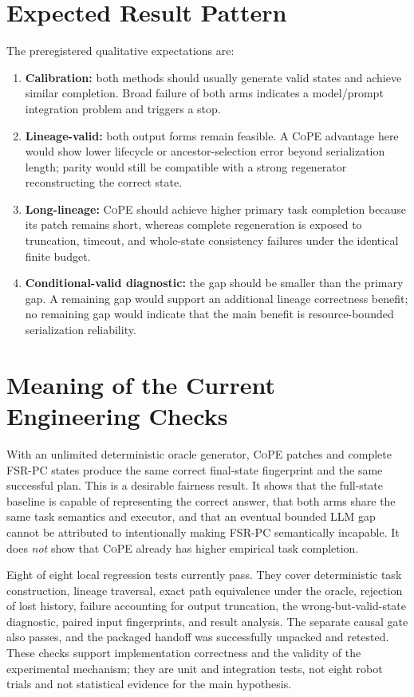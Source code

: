 \documentclass[10pt]{article}
\newcommand{\CoPE}{\textsc{CoPE}}
\newcommand{\FSRPC}{\textsc{FSR-PC}}
\begin{document}
\section{Expected Result Pattern}

The preregistered qualitative expectations are:
\begin{enumerate}
    \item \textbf{Calibration:} both methods should usually generate valid
    states and achieve similar completion.  Broad failure of both arms indicates
    a model/prompt integration problem and triggers a stop.
    \item \textbf{Lineage-valid:} both output forms remain feasible.  A \CoPE{}
    advantage here would show lower lifecycle or ancestor-selection error beyond
    serialization length; parity would still be compatible with a strong
    regenerator reconstructing the correct state.
    \item \textbf{Long-lineage:} \CoPE{} should achieve higher primary task
    completion because its patch remains short, whereas complete regeneration
    is exposed to truncation, timeout, and whole-state consistency failures
    under the identical finite budget.
    \item \textbf{Conditional-valid diagnostic:} the gap should be smaller than
    the primary gap.  A remaining gap would support an additional lineage
    correctness benefit; no remaining gap would indicate that the main benefit
    is resource-bounded serialization reliability.
\end{enumerate}

\section{Meaning of the Current Engineering Checks}

With an unlimited deterministic oracle generator, \CoPE{} patches and complete
\FSRPC{} states produce the same correct final-state fingerprint and the same
successful plan.  This is a desirable fairness result.  It shows that the
full-state baseline is capable of representing the correct answer, that both
arms share the same task semantics and executor, and that an eventual bounded
LLM gap cannot be attributed to intentionally making \FSRPC{} semantically
incapable.  It does \emph{not} show that \CoPE{} already has higher empirical
task completion.

Eight of eight local regression tests currently pass.  They cover deterministic
task construction, lineage traversal, exact path equivalence under the oracle,
rejection of lost history, failure accounting for output truncation, the
wrong-but-valid-state diagnostic, paired input fingerprints, and result
analysis.  The separate causal gate also passes, and the packaged handoff was
successfully unpacked and retested.  These checks support implementation
correctness and the validity of the experimental mechanism; they are unit and
integration tests, not eight robot trials and not statistical evidence for the
main hypothesis.
\end{document}
